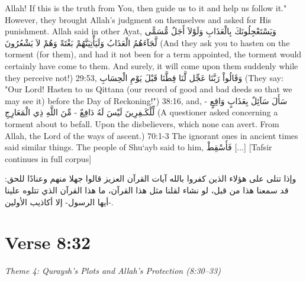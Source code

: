 \documentclass[11pt,a4paper,openany]{book}
\let\textAR\textarabic
\begin{document}
\begin{tafsirbox}
Allah! If this is the truth from You, then guide us to it and help us follow it." However, they brought Allah's judgment on themselves and asked for His punishment. Allah said in other Ayat, \textAR{وَيَسْتَعْجِلُونَكَ} \textAR{بِالْعَذَابِ} \textAR{وَلَوْلاَ} \textAR{أَجَلٌ} \textAR{مُّسَمًّى} \textAR{لَّجَآءَهُمُ} \textAR{الْعَذَابُ} \textAR{وَلَيَأْتِيَنَّهُمْ} \textAR{بَغْتَةً} \textAR{وَهُمْ} \textAR{لاَ} \textAR{يَشْعُرُونَ} (And they ask you to hasten on the torment (for them), and had it not been for a term appointed, the torment would certainly have come to them. And surely, it will come upon them suddenly while they perceive not!) 29:53, \textAR{وَقَالُواْ} \textAR{رَبَّنَا} \textAR{عَجِّل} \textAR{لَّنَا} \textAR{قِطَّنَا} \textAR{قَبْلَ} \textAR{يَوْمِ} \textAR{الْحِسَابِ} (They say: "Our Lord! Hasten to us Qittana (our record of good and bad deeds so that we may see it) before the Day of Reckoning!") 38:16, and, \textAR{سَأَلَ} \textAR{سَآئِلٌ} \textAR{بِعَذَابٍ} \textAR{وَاقِعٍ} - \textAR{لِّلْكَـفِرِينَ} \textAR{لَيْسَ} \textAR{لَهُ} \textAR{دَافِعٌ} - \textAR{مِّنَ} \textAR{اللَّهِ} \textAR{ذِي} \textAR{الْمَعَارِجِ} (A questioner asked concerning a torment about to befall. Upon the disbelievers, which none can avert. From Allah, the Lord of the ways of ascent.) 70:1-3 The ignorant ones in ancient times said similar things. The people of Shu`ayb said to him, \textAR{فَأَسْقِطْ}  [...] [Tafsir continues in full corpus]
\end{tafsirbox}


\begin{muyassarbox}
\textAR{وإذا تتلى على هؤلاء الذين كفروا بالله آيات القرآن العزيز قالوا جهلا منهم وعنادًا للحق: قد سمعنا هذا من قبل، لو نشاء لقلنا مثل هذا القرآن، ما هذا القرآن الذي تتلوه علينا -أيها الرسول- إلا أكاذيب الأولين.}
\end{muyassarbox}


\newpage

\section{Verse 8:32}
{\small\color{accent2}\itshape Theme 4: Quraysh's Plots and Allah's Protection (8:30--33)}
\end{document}
